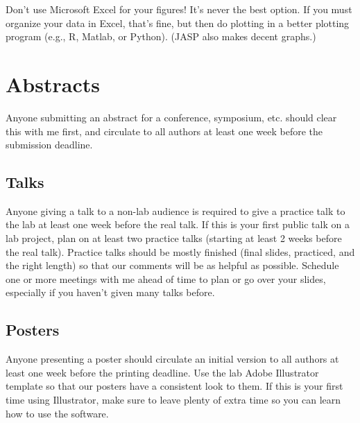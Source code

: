 \documentclass[letterpaper,12pt,oneside]{memoir}
\begin{document}
\begin{shaded}
\noindent Don't use Microsoft Excel for your figures! It's never the best option. If you must organize your data in Excel, that's fine, but then do plotting in a better plotting program (e.g., R, Matlab, or Python). (JASP also makes decent graphs.)
\end{shaded}





\section{Abstracts}
Anyone submitting an abstract for a conference, symposium, etc. should clear this with me first, and circulate to all authors at least one week before the submission deadline.

\subsection{Talks}
Anyone giving a talk to a non-lab audience is required to give a practice talk to the lab at least one week before the real talk. If this is your first public talk on a lab project, plan on at least two practice talks (starting at least 2 weeks before the real talk). Practice talks should be mostly finished (final slides, practiced, and the right length) so that our comments will be as helpful as possible. Schedule one or more meetings with me ahead of time to plan or go over your slides, especially if you haven't given many talks before.

\subsection{Posters}
Anyone presenting a poster should circulate an initial version to all authors at least one week before the printing deadline. Use the lab Adobe Illustrator template so that our posters have a consistent look to them. If this is your first time using Illustrator, make sure to leave plenty of extra time so you can learn how to use the software.
\end{document}
